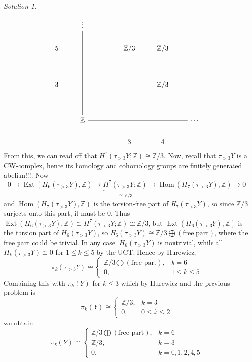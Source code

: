 \documentclass[reqno]{amsart}
\theoremstyle{definition}
\theoremstyle{remark}
\newtheorem*{solution}{Solution}
\DeclareMathOperator{\Hom}{Hom}
\DeclareMathOperator{\Ext}{Ext}
\begin{document}
\begin{solution}
\[\begin{tikzcd}
	& \vdots \\
	5 &&& {\mathbb{Z}/3} & {\mathbb{Z}/3} \\
	\\
	3 &&&& {\mathbb{Z}/3} \\
	\\
	& {\mathbb{Z}} &&&& \cdots \\
	&&& 3 & 4
	\arrow[no head, from=6-2, to=1-2]
	\arrow[no head, from=6-2, to=6-6]
\end{tikzcd}\]
From this, we can read off that
$H^{7}\left( \tau_{>3}Y; \mathbb{Z} \right) 
\cong \mathbb{Z}/3$. 
Now,
recall that $\tau_{>3}Y$ is a CW-complex, hence
its homology and cohomology groups are
finitely generated abelian!!!. Now
\[
0 \to \Ext \left(H_6 (\tau_{>3}Y), \mathbb{Z} \right) 
\to \underbrace{H^{7}\left( \tau_{>3}Y;\mathbb{Z} \right)}_{\cong
\mathbb{Z}/3} \to 
\Hom \left( H_7\left( \tau_{>3}Y \right) ,\mathbb{Z} \right) \to 
0
\] 
and
$\Hom \left( H_7 \left( \tau_{>3}Y \right) ,\mathbb{Z} \right) $ 
is the torsion-free part of
$H_7 \left( \tau_{>3}Y \right) $, so
since $\mathbb{Z}/3$ surjects onto this part, it
must be $0$. Thus
$\Ext\left( H_6\left( \tau_{>3}Y \right) ,\mathbb{Z} \right) 
\cong H^{7}\left( \tau_{>3}Y;\mathbb{Z} \right) 
\cong \mathbb{Z}/3$, but
$\Ext \left( H_6 \left( \tau_{>3}Y \right) ,\mathbb{Z} \right) $ 
is the torsion part of $H_6 \left( \tau_{>3}Y \right) $, so
$H_6 \left( \tau_{>3}Y \right) 
\cong \mathbb{Z}/3 \bigoplus \left( \text{free part} \right) $,
where the free part could be trivial. In any case,
$H_6 \left( \tau_{>3}Y \right) $ is nontrivial,
while all
$H_k \left( \tau_{>3}Y \right) \cong 0$ for 
$1\le k \le 5$ by the UCT. Hence
by Hurewicz,  
\[
\pi_k \left( \tau_{>3}Y \right) 
\cong
\begin{cases}
    \mathbb{Z}/3 \bigoplus \left( \text{free part} \right),& k=6\\
    0,& 1\le k\le 5
\end{cases}
\] 
Combining this with
$\pi_k \left( Y \right) $ for
$k \le 3$ which by Hurewicz and the previous problem is
\[
\pi_k(Y) \cong
\begin{cases}
    \mathbb{Z}/3,& k=3\\
    0,& 0\le k\le 2
\end{cases}
\] 
we obtain
\[
\pi_k(Y) \cong
\begin{cases}
    \mathbb{Z}/3 \bigoplus \left( \text{free part} \right),& k=6\\
    \mathbb{Z}/3,& k=3\\
    0,& k=0,1,2,4,5
\end{cases}
\] 



\end{solution}
\end{document}
